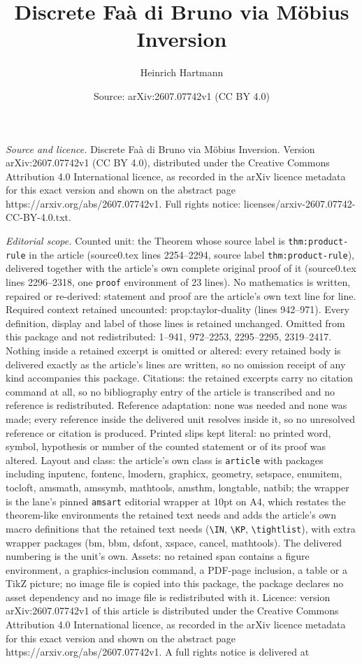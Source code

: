 \documentclass[10pt,a4paper]{amsart}
\title[Discrete Fa\`a di Bruno via M\"obius Inversion]{Discrete Fa\`a di Bruno via M\"obius Inversion}
\author{Heinrich Hartmann}
\date{Source: arXiv:2607.07742v1 (CC BY 4.0)}
\begin{document}
\maketitle

\noindent\emph{Source and licence.} Discrete Fa\`a di Bruno via M\"obius Inversion. Version arXiv:2607.07742v1 (CC BY 4.0), distributed under the Creative Commons Attribution 4.0 International licence, as recorded in the arXiv licence metadata for this exact version and shown on the abstract page https://arxiv.org/abs/2607.07742v1. Full rights notice: licenses/arxiv-2607.07742-CC-BY-4.0.txt.\par\smallskip

\noindent\textit{Editorial scope.} Counted unit: the Theorem whose source label is \texttt{thm:product-rule} in the article (source0.tex lines 2254--2294, source label \texttt{thm:product-rule}), delivered together with the article's own complete original proof of it (source0.tex lines 2296--2318, one \texttt{proof} environment of 23 lines). No mathematics is written, repaired or re-derived: statement and proof are the article's own text line for line. Required context retained uncounted: prop:taylor-duality (lines 942--971). Every definition, display and label of those lines is retained unchanged. Omitted from this package and not redistributed: 1--941, 972--2253, 2295--2295, 2319--2417. Nothing inside a retained excerpt is omitted or altered: every retained body is delivered exactly as the article's lines are written, so no omission receipt of any kind accompanies this package. Citations: the retained excerpts carry no citation command at all, so no bibliography entry of the article is transcribed and no reference is redistributed. Reference adaptation: none was needed and none was made; every reference inside the delivered unit resolves inside it, so no unresolved reference or citation is produced. Printed slips kept literal: no printed word, symbol, hypothesis or number of the counted statement or of its proof was altered. Layout and class: the article's own class is \texttt{article} with packages including inputenc, fontenc, lmodern, graphicx, geometry, setspace, enumitem, tocloft, amsmath, amssymb, mathtools, amsthm, longtable, natbib; the wrapper is the lane's pinned \texttt{amsart} editorial wrapper at 10pt on A4, which restates the theorem-like environments the retained text needs and adds the article's own macro definitions that the retained text needs (\texttt{\textbackslash IN}, \texttt{\textbackslash KP}, \texttt{\textbackslash tightlist}), with extra wrapper packages (bm, bbm, dsfont, xspace, cancel, mathtools). The delivered numbering is the unit's own. Assets: no retained span contains a figure environment, a graphics-inclusion command, a PDF-page inclusion, a table or a TikZ picture; no image file is copied into this package, the package declares no asset dependency and no image file is redistributed with it. Licence: version arXiv:2607.07742v1 of this article is distributed under the Creative Commons Attribution 4.0 International licence, as recorded in the arXiv licence metadata for this exact version and shown on the abstract page https://arxiv.org/abs/2607.07742v1. A full rights notice is delivered at 
\end{document}
